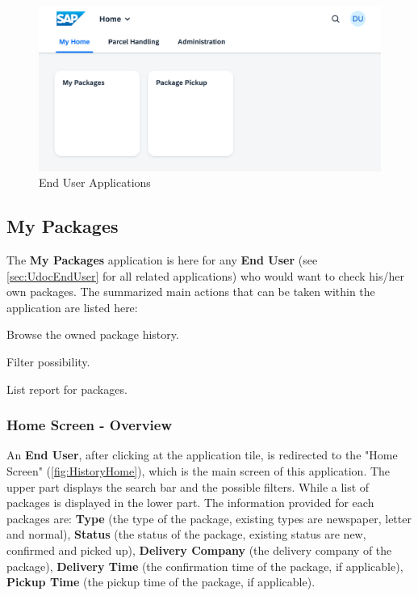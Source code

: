 \begin{figure}[H]
	\centering
	\includegraphics[width=1\linewidth]{images/user_doc/overviews/MyHomeTab.png}
	\caption{End User Applications}
	\label{fig:EndUserApplications}
\end{figure}


% 

\subsection{My Packages}
\label{subsec:ph}

The \textbf{My Packages} application is here for any \textbf{End User} (see \autoref{sec:UdocEndUser} for all related applications) who would want to check his/her own packages. 
The summarized main actions that can be taken within the application are listed here:

\begin{compactenum}
	\item Browse the owned package history.
        \begin{compactenum}
        	\item Filter possibility.
            \item List report for packages.
        \end{compactenum}
\end{compactenum}

\subsubsection{Home Screen - Overview}
An \textbf{End User}, after clicking at the application tile, is redirected to the "Home Screen" (\autoref{fig:HistoryHome}), which is the main screen of this application. The upper part displays the search bar and the possible filters. While a list of packages is displayed in the lower part. The information provided for each packages are: \textbf{Type} (the type of the package, existing types are newspaper, letter and normal), \textbf{Status} (the status of the package, existing status are new, confirmed and picked up), \textbf{Delivery Company} (the delivery company of the package), \textbf{Delivery Time} (the confirmation time of the package, if applicable), \textbf{Pickup Time} (the pickup time of the package, if applicable).

